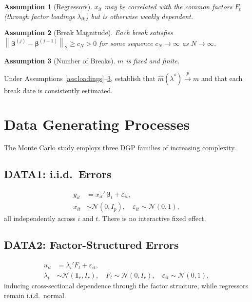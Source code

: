 \documentclass[12pt, a4paper]{article}
\theoremstyle{plain}
\newtheorem{assumption}{Assumption}[section]
\theoremstyle{definition}
\theoremstyle{remark}
\newcommand{\bbeta}{\bm{\beta}}
\newcommand{\norm}[1]{\left\| #1 \right\|}
\begin{document}
\begin{onehalfspacing}
\begin{assumption}[Regressors]
  \label{ass:regressors}
  $x_{it}$ may be correlated with the common factors $F_t$ (through factor
  loadings $\lambda_{ik}$) but is otherwise weakly dependent.
\end{assumption}

\begin{assumption}[Break Magnitude]
  \label{ass:breaks}
  Each break satisfies $\norm{\bbeta^{(j)} - \bbeta^{(j-1)}}_2 \ge c_N > 0$
  for some sequence $c_N \to \infty$ as $N \to \infty$.
\end{assumption}

\begin{assumption}[Number of Breaks]
  \label{ass:number}
  $m$ is fixed and finite.
\end{assumption}

Under Assumptions \ref{ass:loadings}--\ref{ass:number}, \citet{kaddoura2023estimation}
establish that $\hat{m}(\lambda^*) \xrightarrow{p} m$ and that each break date
is consistently estimated.

\section{Data Generating Processes}
\label{sec:dgp}

The Monte Carlo study employs three DGP families of increasing complexity.

\subsection{DATA1: i.i.d.\ Errors}

\begin{align}
  y_{it} &= x_{it}'\,\bbeta_t + \varepsilon_{it},\\
  x_{it} &\sim \mathcal{N}(0, I_p), \quad \varepsilon_{it} \sim \mathcal{N}(0,1),
\end{align}
all independently across $i$ and $t$.  There is no interactive fixed effect.

\subsection{DATA2: Factor-Structured Errors}

\begin{align}
  u_{it} &= \lambda_i' F_t + \varepsilon_{it},\\
  \lambda_i &\sim \mathcal{N}(\mathbf{1}_r, I_r), \quad
  F_t \sim \mathcal{N}(0, I_r), \quad \varepsilon_{it} \sim \mathcal{N}(0,1),
\end{align}
inducing cross-sectional dependence through the factor structure, while
regressors remain i.i.d.\ normal.


\end{onehalfspacing}
\end{document}
